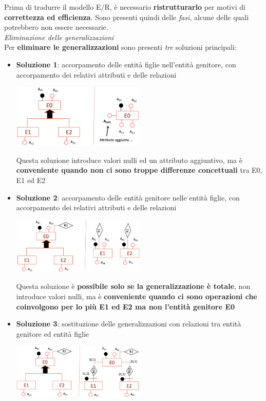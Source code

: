 \documentclass{article}
\begin{document}
Prima di tradurre il modello E/R, è necessario \textbf{ristrutturarlo} per motivi di \textbf{correttezza ed efficienza}. Sono presenti quindi delle \textit{fasi}, alcune delle quali potrebbero non essere necessarie.\vspace*{14pt}\\
\textit{Eliminazione delle generalizzazioni}\\
Per \textbf{eliminare le generalizzazioni} sono presenti \textit{tre} soluzioni principali:
\begin{itemize}[label={-}, leftmargin=1cm]
    \itemsep0em
    \item \textbf{Soluzione 1}: accorpamento delle entità figlie nell'entità genitore, con accorpamento dei relativi attributi e delle relazioni
    \begin{center}
        \includegraphics[width=0.5\textwidth]{foto 1.png}
    \end{center}
    Questa soluzione introduce valori nulli ed un attributo aggiuntivo, ma è \textbf{conveniente quando non ci sono troppe differenze concettuali} tra E0, E1 ed E2
    \item \textbf{Soluzione 2}: accorpamento delle entità genitore nelle entità figlie, con accorpamento dei relativi attributi e delle relazioni
    \begin{center}
        \includegraphics[width=0.5\textwidth]{foto 2.png}
    \end{center}
    Questa soluzione è \textbf{possibile solo se la generalizzazione è totale}, non introduce valori nulli, ma è \textbf{conveniente quando ci sono operazioni che coinvolgono per lo più E1 ed E2 ma non l'entità genitore E0}
    \item \textbf{Soluzione 3}: sostituzione delle generalizzazioni con relazioni tra entità genitore ed entità figlie
    \begin{center}
        \includegraphics[width=0.5\textwidth]{foto 3.png}

\end{center}
\end{itemize}
\end{document}
